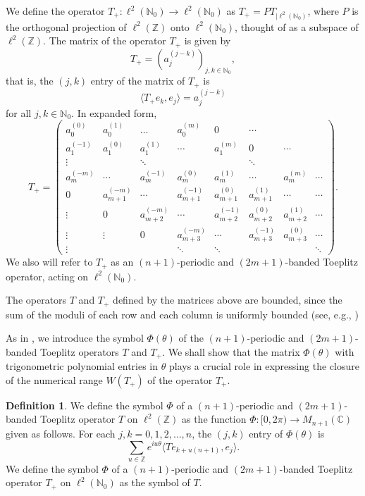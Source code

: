 \documentclass[12pt,reqno]{amsart}
\theoremstyle{definition}
\newtheorem{definition}[theorem]{Definition}
\newcommand{\Z}{{\mathbb{Z}}}
\newcommand{\C}{{\mathbb{C}}}
\newcommand{\N}{{\mathbb{N}}}
\begin{document}
We define the operator $T_+: \ell^2(\N_0) \to \ell^2(\N_0)$ as $T_+=P T_{| \ell^2(\N_0)}$, where $P$ is the orthogonal projection of $\ell^2(\Z)$ onto $\ell^2(\N_0)$, thought of as a subspace of $\ell^2(\Z)$. The matrix of the operator $T_+$ is given by
\[
T_+=\left( a_{j}^{(j-k)} \right)_{j, k \in \N_0},
\]
that is, the $(j,k)$ entry of the matrix of $T_+$ is
\begin{equation}\label{eq:def_a}
\langle T_+ e_k, e_j \rangle = a_{j}^{(j-k)}
\end{equation}
for all $j, k \in \N_0$. In expanded form,
\[
T_+= 
\begin{pmatrix}
  a_0^{(0)} & a_0^{(1)} & \dots & a_0^{(m)}& 0 & \cdots \\[5pt]
 a_1^{(-1)} & a_1^{(0)} & a_1^{(1)} & \cdots & a_1^{(m)} & 0 & \cdots &  \\[5pt]
 \vdots & & \ddots & & & \ddots \\[5pt]
 a_m^{(-m)} & \cdots & a_m^{(-1)}& a_m^{(0)}& a_m^{(1)}& \cdots &a_m^{(m)} &\cdots \\[5pt]
 0 & a_{m+1}^{(-m)}& \cdots & a_{m+1}^{(-1)}& a_{m+1}^{(0)}& a_{m+1}^{(1)} &\cdots & \cdots \\[5pt]
  \vdots & 0 & a_{m+2}^{(-m)}& \cdots & a_{m+2}^{(-1)}& a_{m+2}^{(0)}& a_{m+2}^{(1)} &\cdots \\[5pt]
   \vdots  & \vdots & 0 & a_{m+3}^{(-m)}& \cdots & a_{m+3}^{(-1)}& a_{m+3}^{(0)}&\cdots  \\[5pt]
 \vdots & & & \ddots &\ddots & & & \ddots 
\end{pmatrix}.
\]
We also will refer to $T_+$ as an $(n+1)$-periodic and $(2m+1)$-banded Toeplitz operator, acting on $\ell^2(\N_0)$.


The operators $T$ and $T_+$ defined by the matrices above are bounded, since the sum of the moduli of each row and each column is uniformly bounded (see, e.g., \cite[Example 2.3]{Kato})


 As in \cite{IM}, we introduce the symbol $\Phi(\theta)$ of the $(n+1)$-periodic and $(2m+1)$-banded Toeplitz operators $T$ and $T_+$. We shall show that the matrix $\Phi(\theta)$ with trigonometric polynomial entries in $\theta$ plays a crucial role in expressing the closure of  the numerical range $W(T_+)$ of the operator $T_+$.

\begin{definition}\label{def:symbol}
We define the symbol $\Phi$ of a $(n+1)$-periodic and $(2m+1)$-banded Toeplitz operator $T$ on $\ell^2(\Z)$ as the function $\Phi:[0, 2 \pi) \to M_{n+1}(\C)$ given as follows. For each $j,k=0, 1, 2, \dots, n$, the $(j,k)$ entry of $\Phi(\theta)$ is
\[
\sum_{u\in \Z} e^{i u \theta} \langle T e_{k+u(n+1)}, e_j \rangle. 
\]
We define the symbol $\Phi$ of a $(n+1)$-periodic and $(2m+1)$-banded Toeplitz operator $T_+$ on $\ell^2(\N_0)$ as the symbol of $T$.
\end{definition}
\end{document}

